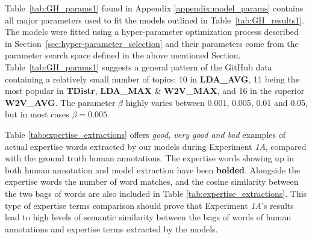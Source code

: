             Table~\ref{tab:GH_params1} found in Appendix \ref{appendix:model_params} contains all major parameters used to fit the models outlined in Table~\ref{tab:GH_results1}. The models were fitted using a hyper-parameter optimization process described in Section~\ref{sec:hyper-parameter_selection} and their parameters come from the parameter search space defined in the above mentioned Section. Table~\ref{tab:GH_params1} suggests a general pattern of the GitHub data containing a relatively small number of topics: 10 in \textbf{LDA\_AVG}, 11 being the most popular in \textbf{TDistr}, \textbf{LDA\_MAX} \& \textbf{W2V\_MAX}, and 16 in the superior \textbf{W2V\_AVG}. The parameter $\beta$ highly varies between 0.001, 0.005, 0.01 and 0.05, but in most cases $\beta=0.005$.
            
            Table \ref{tab:expertise_extractions} offers \emph{good, very good and bad} examples of actual expertise words extracted by our models during Experiment \emph{1A}, compared with the ground truth human annotations. The expertise words showing up in both human annotation and model extraction have been \textbf{bolded}. Alongside the expertise words the number of word matches, and the cosine similarity between the two bags of words are also included in Table \ref{tab:expertise_extractions}. This type of expertise terms comparison should prove that Experiment \emph{1A}'s results lead to high levels of semantic similarity between the bags of words of human annotations and expertise terms extracted by the models.
        
